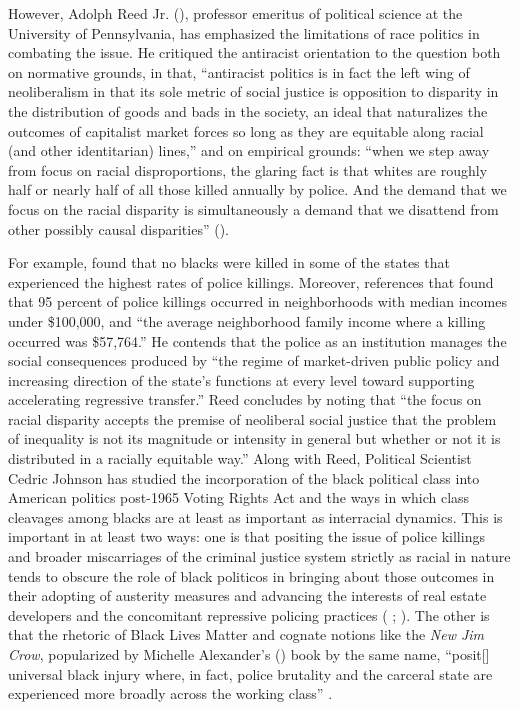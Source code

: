\documentclass[12pt]{article}
\begin{document}
However, Adolph Reed Jr. (\citeyear{reedHowRacialDisparity2016}), professor emeritus of political science at the University of Pennsylvania, has emphasized the limitations of race politics in combating the issue. He critiqued the antiracist orientation to the question both on normative grounds, in that, “antiracist politics is in fact the left wing of neoliberalism in that its sole metric of social justice is opposition to disparity in the distribution of goods and bads in the society, an ideal that naturalizes the outcomes of capitalist market forces so long as they are equitable along racial (and other identitarian) lines,” and on empirical grounds: “when we step away from focus on racial disproportions, the glaring fact is that whites are roughly half or nearly half of all those killed annually by police. And the demand that we focus on the racial disparity is simultaneously a demand that we disattend from other possibly causal disparities” (\cite{reedHowRacialDisparity2016}).

For example, \textcite{reedHowRacialDisparity2016} found that no blacks were killed in some of the states that experienced the highest rates of police killings. Moreover, \textcite{reedHowRacialDisparity2016} references that \textcite{jilani95PoliceKillings2015} found that 95 percent of police killings occurred in neighborhoods with median incomes under \$100,000, and “the average neighborhood family income where a killing occurred was \$57,764.” He contends that the police as an institution manages the social consequences produced by “the regime of market-driven public policy and increasing direction of the state’s functions at every level toward supporting accelerating regressive transfer.” Reed concludes by noting that “the focus on racial disparity accepts the premise of neoliberal social justice that the problem of inequality is not its magnitude or intensity in general but whether or not it is distributed in a racially equitable way.” Along with Reed, Political Scientist Cedric Johnson has studied the incorporation of the black political class into American politics post-1965 Voting Rights Act and the ways in which class cleavages among blacks are at least as important as interracial dynamics. This is important in at least two ways: one is that positing the issue of police killings and broader miscarriages of the criminal justice system strictly as racial in nature tends to obscure the role of black politicos in bringing about those outcomes in their adopting of austerity measures and advancing the interests of real estate developers and the concomitant repressive policing practices (\citeauthor{johnsonAfterwordBaltimorePolicing2016} \citeyear[305]{johnsonAfterwordBaltimorePolicing2016}; \citeyear[179]{johnsonTrumpismPolicingProblem2019}). The other is that the rhetoric of Black Lives Matter and cognate notions like the \textit{New Jim Crow}, popularized by Michelle Alexander’s (\citeyear{alexanderNewJimCrow2010}) book by the same name, “posit[] universal black injury where, in fact, police brutality and the carceral state are experienced more broadly across the working class” \parencite*[317]{johnsonAfterwordBaltimorePolicing2016}.
\end{document}

